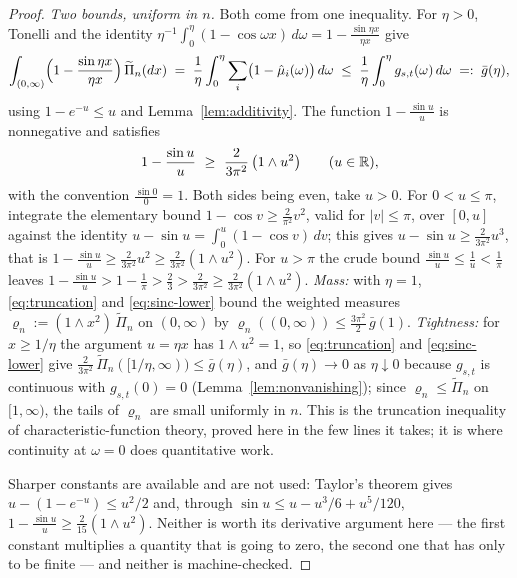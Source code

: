 \begin{proof}
\emph{Two bounds, uniform in $n$.} Both come from one inequality. For $\eta > 0$, Tonelli and
the identity $\eta^{-1}\int_0^\eta (1 - \cos\omega x)\,d\omega = 1 - \frac{\sin\eta x}{\eta x}$
give
\begin{equation}\label{eq:truncation}
  \int_{(0,\infty)} \Bigl(1 - \frac{\sin\eta x}{\eta x}\Bigr)\,\widetilde\Pi_n(dx)
  \;=\; \frac1\eta\int_0^\eta \sum_i\bigl(1 - \hat\mu_i(\omega)\bigr)\,d\omega
  \;\le\; \frac1\eta\int_0^\eta g_{s,t}(\omega)\,d\omega \;=:\; \bar g(\eta),
\end{equation}
using $1 - e^{-u} \le u$ and Lemma~\ref{lem:additivity}. The function $1 - \frac{\sin u}{u}$ is
nonnegative and satisfies
\begin{equation}\label{eq:sinc-lower}
  1 - \frac{\sin u}{u} \ \ge\ \frac{2}{3\pi^2}\,\bigl(1 \wedge u^2\bigr)
  \qquad (u \in \mathbb{R}),
\end{equation}
with the convention $\frac{\sin 0}{0} = 1$. Both sides being even, take $u > 0$. For
$0 < u \le \pi$, integrate the elementary bound $1 - \cos v \ge \frac{2}{\pi^2}v^2$, valid for
$|v| \le \pi$, over $[0,u]$ against the identity $u - \sin u = \int_0^u (1 - \cos v)\,dv$; this
gives $u - \sin u \ge \frac{2}{3\pi^2}u^3$, that is
$1 - \frac{\sin u}{u} \ge \frac{2}{3\pi^2}u^2 \ge \frac{2}{3\pi^2}(1 \wedge u^2)$. For
$u > \pi$ the crude bound $\frac{\sin u}{u} \le \frac1u < \frac1\pi$ leaves
$1 - \frac{\sin u}{u} > 1 - \frac1\pi > \frac23 > \frac{2}{3\pi^2} \ge
\frac{2}{3\pi^2}(1 \wedge u^2)$. \emph{Mass:} with $\eta = 1$, \ref{eq:truncation} and
\ref{eq:sinc-lower} bound the weighted measures
$\varrho_n := (1 \wedge x^2)\,\widetilde\Pi_n$ on $(0,\infty)$ by
$\varrho_n((0,\infty)) \le \tfrac{3\pi^2}{2}\,\bar g(1)$. \emph{Tightness:} for $x \ge 1/\eta$
the argument $u = \eta x$ has $1 \wedge u^2 = 1$, so \ref{eq:truncation} and
\ref{eq:sinc-lower} give
$\tfrac{2}{3\pi^2}\,\widetilde\Pi_n([1/\eta,\infty)) \le \bar g(\eta)$, and
$\bar g(\eta) \to 0$ as $\eta \downarrow 0$ because $g_{s,t}$ is continuous with
$g_{s,t}(0) = 0$ (Lemma~\ref{lem:nonvanishing}); since $\varrho_n \le \widetilde\Pi_n$ on
$[1,\infty)$, the tails of $\varrho_n$ are small uniformly in $n$. This is the truncation
inequality of characteristic-function theory, proved here in the few lines it takes; it is
where continuity at $\omega = 0$ does quantitative work.

Sharper constants are available and are not used: Taylor's theorem gives
$u - (1 - e^{-u}) \le u^2/2$ and, through $\sin u \le u - u^3/6 + u^5/120$,
$1 - \frac{\sin u}{u} \ge \frac{2}{15}(1 \wedge u^2)$. Neither is worth its derivative
argument here --- the first constant multiplies a quantity that is going to zero, the second
one that has only to be finite --- and neither is machine-checked.


\end{proof}
